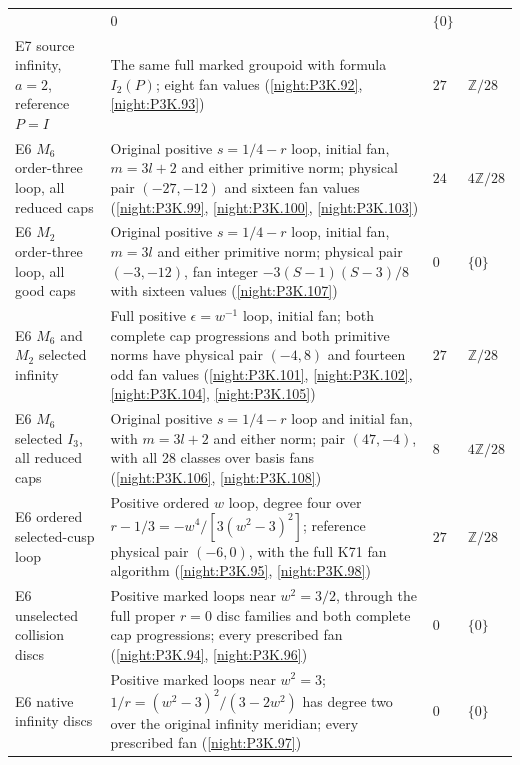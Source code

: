 \begin{longtable}{@{}p{.23\linewidth}p{.37\linewidth}p{.16\linewidth}p{.17\linewidth}@{}}
  & $0$ & $\{0\}$\\
E7 source infinity, $a=2$, reference $P=I$ & The same full
  marked groupoid with formula $I_2(P)$; eight fan values
  (\cref{night:P3K.92}, \cref{night:P3K.93})
  & $27$ & $\mathbb Z/28$\\
E6 $M_6$ order-three loop, all reduced caps & Original positive
  $s=1/4-r$ loop, initial fan, $m=3l+2$ and either primitive norm;
  physical pair $(-27,-12)$ and sixteen fan values
  (\cref{night:P3K.99}, \cref{night:P3K.100}, \cref{night:P3K.103})
  & $24$ & $4\mathbb Z/28$\\
E6 $M_2$ order-three loop, all good caps & Original positive
  $s=1/4-r$ loop, initial fan, $m=3l$ and either primitive norm;
  physical pair $(-3,-12)$, fan integer $-3(S-1)(S-3)/8$
  with sixteen values (\cref{night:P3K.107})
  & $0$ & $\{0\}$\\
E6 $M_6$ and $M_2$ selected infinity & Full positive
  $\epsilon=w^{-1}$ loop, initial fan; both complete cap
  progressions and both primitive norms have physical pair
  $(-4,8)$ and fourteen odd fan values
  (\cref{night:P3K.101}, \cref{night:P3K.102}, \cref{night:P3K.104}, \cref{night:P3K.105})
  & $27$ & $\mathbb Z/28$\\
E6 $M_6$ selected $I_3$, all reduced caps & Original positive
  $s=1/4-r$ loop and initial fan, with $m=3l+2$ and either norm;
  pair $(47,-4)$, with all 28 classes over basis fans
  (\cref{night:P3K.106}, \cref{night:P3K.108})
  & $8$ & $4\mathbb Z/28$\\
E6 ordered selected-cusp loop & Positive ordered $w$ loop,
  degree four over $r-1/3=-w^4/[3(w^2-3)^2]$; reference
  physical pair $(-6,0)$, with the full K71 fan algorithm
  (\cref{night:P3K.95}, \cref{night:P3K.98})
  & $27$ & $\mathbb Z/28$\\
E6 unselected collision discs & Positive marked loops near
  $w^2=3/2$, through the full proper $r=0$ disc families and
  both complete cap progressions; every prescribed fan
  (\cref{night:P3K.94}, \cref{night:P3K.96})
  & $0$ & $\{0\}$\\
E6 native infinity discs & Positive marked loops near $w^2=3$;
  $1/r=(w^2-3)^2/(3-2w^2)$ has degree two over the original
  infinity meridian; every prescribed fan
  (\cref{night:P3K.97})
  & $0$ & $\{0\}$\\
\end{longtable}
\endgroup

